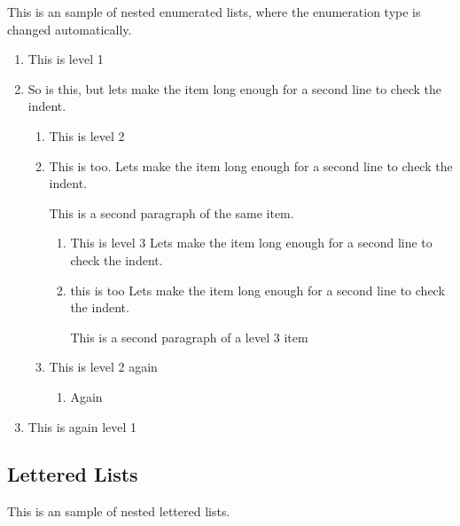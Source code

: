 This is an sample of nested enumerated lists, where the enumeration
type is changed automatically.
\begin{enumerate}
  \item This is level 1
  \item So is this, but lets make the item long enough for a second
        line to check the indent. 
  \begin{enumerate}
    \item This is level 2
    \item This is too.  Lets make the item long enough for a second
          line to check the indent. 

          This is a second paragraph of the same item.
    \begin{enumerate}
      \item This is level 3 Lets make the item long enough for a
            second line to check the indent.
      \item this is too Lets make the item long enough for a second
            line  to check the indent.

            This is a second paragraph of a level 3 item
    \end{enumerate}
    \item This is level 2 again
    \begin{enumerate}
      \item Again
    \end{enumerate}
  \end{enumerate}
  \item This is again level 1
\end{enumerate}

\subsection{Lettered Lists}


This is an sample of nested lettered lists.

